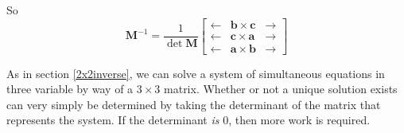 \documentclass[11pt, a4paper]{article}
\begin{document}
So
\begin{equation*}
\boldsymbol{M}^{-1}=\frac{1}{\det\boldsymbol{M}}\begin{bmatrix} \leftarrow & \boldsymbol{b}\times\boldsymbol{c} & \rightarrow \\ \leftarrow & \boldsymbol{c}\times\boldsymbol{a} & \rightarrow \\ \leftarrow & \boldsymbol{a}\times\boldsymbol{b} & \rightarrow \end{bmatrix}
\end{equation*} \newline \par

As in section \ref{2x2inverse}, we can solve a system of simultaneous equations in three variable by way of a $3\times3$ matrix. Whether or not a unique solution exists can very simply be determined by taking the determinant of the matrix that represents the system. If the determinant \emph{is} 0, then more work is required.

\vspace{0.5cm}
\end{document}
